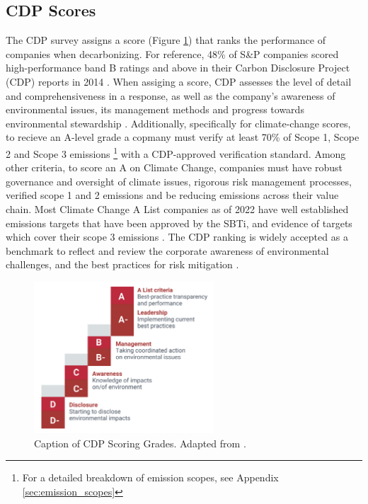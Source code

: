 \subsection{CDP Scores}
The CDP survey assigns a score (Figure \ref{fig:CDP-scores}) that ranks the performance of companies when decarbonizing.  For reference, 48\% of S\&P companies scored high-performance band B ratings and above in their Carbon Disclosure Project (CDP) reports in 2014 \cite{Upadhyay2022Improving}. When assiging a score, CDP assesses the level of detail and comprehensiveness in a response, as well as the company’s awareness of environmental issues, its management methods and progress towards environmental stewardship \cite{CDP2022ScoringPDF}. Additionally, specifically for climate-change scores, to recieve an A-level grade a copmany must verify at least 70\% of Scope 1, Scope 2 and Scope 3 emissions \footnote{For a detailed breakdown of emission scopes, see Appendix \ref{sec:emission_scopes}} with a CDP-approved verification standard. Among other criteria, to score an A on Climate Change, companies must have robust governance and oversight of climate issues, rigorous risk management processes, verified scope 1 and 2 emissions and be reducing emissions across their value chain. Most Climate Change A List companies as of 2022 have well established emissions targets that have been approved by the SBTi, and evidence of targets which cover their scope 3 emissions \cite{CDP2022ScoringPDF}. The CDP ranking is widely accepted as a benchmark to reflect and review the corporate awareness of environmental challenges, and the best practices for risk mitigation \cite{tefoso}. 


\begin{figure}[h]
    \centering
    \includegraphics[width=0.6\textwidth]{figures/cdp_scoring.png}
    \caption{Caption of CDP Scoring Grades. Adapted from \cite{CDP2022ScoringPDF}.}
    \label{fig:CDP-scores}
\end{figure}


